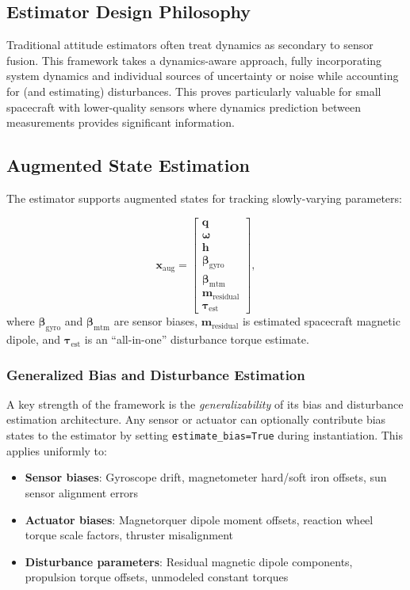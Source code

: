 \documentclass[conference]{IEEEtran}
\begin{document}
\subsection{Estimator Design Philosophy}\label{subsec:est_philosophy}

Traditional attitude estimators often treat dynamics as secondary to sensor fusion. This framework takes a dynamics-aware approach, fully incorporating system dynamics and individual sources of uncertainty or noise while accounting for (and estimating) disturbances. This proves particularly valuable for small spacecraft with lower-quality sensors where dynamics prediction between measurements provides significant information.

\subsection{Augmented State Estimation}\label{subsec:augmented}

The estimator supports augmented states for tracking slowly-varying parameters:

\begin{equation}
\mathbf{x}_{\text{aug}} = \begin{bmatrix}
\mathbf{q} \\ \boldsymbol{\omega} \\ \mathbf{h} \\ \boldsymbol{\beta}_{\text{gyro}} \\ \boldsymbol{\beta}_{\text{mtm}} \\ \mathbf{m}_{\text{residual}} \\ \boldsymbol{\tau}_{\text{est}}
\end{bmatrix},
\end{equation}
where $\boldsymbol{\beta}_{\text{gyro}}$ and $\boldsymbol{\beta}_{\text{mtm}}$ are sensor biases, $\mathbf{m}_{\text{residual}}$ is estimated spacecraft magnetic dipole, and $\boldsymbol{\tau}_{\text{est}}$ is an ``all-in-one'' disturbance torque estimate.

\subsubsection{Generalized Bias and Disturbance Estimation}
A key strength of the framework is the \emph{generalizability} of its bias and disturbance estimation architecture. Any sensor or actuator can optionally contribute bias states to the estimator by setting \texttt{estimate\_bias=True} during instantiation. This applies uniformly to:
\begin{itemize}
    \item \textbf{Sensor biases}: Gyroscope drift, magnetometer hard/soft iron offsets, sun sensor alignment errors
    \item \textbf{Actuator biases}: Magnetorquer dipole moment offsets, reaction wheel torque scale factors, thruster misalignment
    \item \textbf{Disturbance parameters}: Residual magnetic dipole components, propulsion torque offsets, unmodeled constant torques
\end{itemize}
\end{document}
